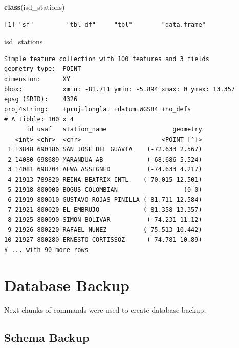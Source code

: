 \documentclass[12pt,oneside]{reedthesis}
\newenvironment{Shaded}{\begin{snugshade}}{\end{snugshade}}
\newcommand{\KeywordTok}[1]{\textcolor[rgb]{0.13,0.29,0.53}{\textbf{#1}}}
\newcommand{\NormalTok}[1]{#1}
\begin{document}
\vspace{0.4cm}
\begin{Shaded}
\begin{Highlighting}[]
        \KeywordTok{class}\NormalTok{(isd_stations)}
\end{Highlighting}
\end{Shaded}
\begin{verbatim}
[1] "sf"         "tbl_df"     "tbl"        "data.frame"
\end{verbatim}
\vspace{0.4cm}
\begin{Shaded}
\begin{Highlighting}[]
\NormalTok{        isd_stations}
\end{Highlighting}
\end{Shaded}
\begin{verbatim}
Simple feature collection with 100 features and 3 fields
geometry type:  POINT
dimension:      XY
bbox:           xmin: -81.711 ymin: -5.894 xmax: 0 ymax: 13.357
epsg (SRID):    4326
proj4string:    +proj=longlat +datum=WGS84 +no_defs
# A tibble: 100 x 4
      id usaf   station_name                  geometry
   <int> <chr>  <chr>                      <POINT [°]>
 1 13848 690186 SAN JOSE DEL GUAVIA    (-72.633 2.567)
 2 14080 698689 MARANDUA AB            (-68.686 5.524)
 3 14081 698704 AFWA ASSIGNED          (-74.633 4.217)
 4 21913 789820 REINA BEATRIX INTL    (-70.015 12.501)
 5 21918 800000 BOGUS COLOMBIAN                  (0 0)
 6 21919 800010 GUSTAVO ROJAS PINILLA (-81.711 12.584)
 7 21921 800020 EL EMBRUJO            (-81.358 13.357)
 8 21925 800090 SIMON BOLIVAR          (-74.231 11.12)
 9 21926 800220 RAFAEL NUNEZ          (-75.513 10.442)
10 21927 800280 ERNESTO CORTISSOZ      (-74.781 10.89)
# ... with 90 more rows
\end{verbatim}
\normalsize

\hypertarget{database-backup}{%
\section{Database Backup}\label{database-backup}}

Next chunks of commands were used to create database backup.

\hypertarget{schema-backup}{%
\subsection{Schema Backup}\label{schema-backup}}

\scriptsize
\end{document}
